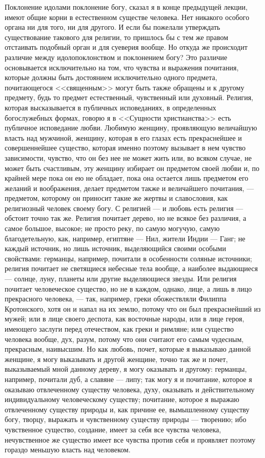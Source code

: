 \documentclass[12pt]{article}
\begin{document}
Поклонение идолами поклонение богу, сказал я в конце предыдущей лекции, имеют общие корни в естественном существе человека. Нет никакого особого органа ни для того, ни для другого. И если бы пожелали утверждать существование такового для религии, то пришлось бы с тем же правом отстаивать подобный орган и для суеверия вообще. Но откуда же происходит различие между идолопоклонством и поклонением богу? Это различие основывается исключительно на том, что чувства и выражения почитания, которые должны быть достоянием исключительно одного предмета, почитающегося <<священным>>  могут быть также обращены и к другому предмету, будь то предмет естественный, чувственный или духовный. Религия, которая высказывается в публичных исповеданиях, в определенных богослужебных формах, говорю я в <<Сущности христианства>>  есть публичное исповедание любви. Любимую женщину, проявляющую величайшую власть над мужчиной, женщину, которая в его глазах есть прекраснейшее и совершеннейшее существо, которая именно поэтому вызывает в нем чувство зависимости, чувство, что он без нее не может жить или, во всяком случае, не может быть счастливым, эту женщину избирает он предметом своей любви и, по крайней мере пока он ею не обладает, пока она остается лишь предметом его желаний и воображения, делает предметом также и величайшего почитания, --- предметом, которому он приносит такие же жертвы и славословия, как религиозный человек своему богу. С религией --- и любовь есть религия --- обстоит точно так же. Религия почитает дерево, но не всякое без различия, а самое большое, высокое; не просто реку, по самую могучую, самую благодетельную, как, например, египтяне --- Нил, жители Индии --- Ганг; не каждый источник, но лишь источник, выделяющийся своими особыми свойствами: германцы, например, почитали в особенности соляные источники; религия почитает не светящиеся небесные тела вообще, а наиболее выдающиеся --- солнце, луну, планеты или другие выделяющиеся звезды. Или религия почитает человеческое существо, но не в каждом, однако, лице, а лишь в лицо прекрасного человека, --- так, например, греки обожествляли Филиппа Кротонского, хотя он и напал на их землю, потому что он был прекраснейший из мужей; или в лице своего деспота, как восточные народы, или в лице героя, имеющего заслуги перед отечеством, как греки и римляне; или существо человека вообще, дух, разум, потому что они считают его самым чудесным, прекрасным, наивысшим. Но как любовь, почет, которые я выказываю данной женщине, я могу выказывать и другой женщине, точно так же и почет, выказываемый мной данному дереву, я могу оказывать и другому: германцы, например, почитали дуб, а славяне --- липу; так могу я и почитание, которое я оказываю отвлеченному существу человека, духу, оказывать и действительному индивидуальному человеческому существу; почитание, которое я выражаю отвлеченному существу природы и, как причине ее, вымышленному существу богу, творцу, выражать и чувственному существу природы --- творению; ибо чувственное существо, создание, имеет за себя все чувства человека, нечувственное же существо имеет все чувства против себя и проявляет поэтому гораздо меньшую власть над человеком. 
\end{document}
